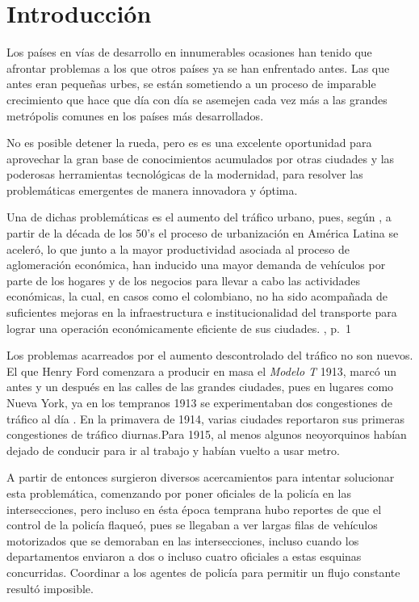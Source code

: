 \hypertarget{introducciuxf3n}{%
\section{Introducción}\label{introducciuxf3n}}

Los países en vías de desarrollo en innumerables ocasiones han tenido
que afrontar problemas a los que otros países ya se han enfrentado
antes. Las que antes eran pequeñas urbes, se están sometiendo a un
proceso de imparable crecimiento que hace que día con día se asemejen
cada vez más a las grandes metrópolis comunes en los países más
desarrollados.

No es posible detener la rueda, pero es es una excelente oportunidad
para aprovechar la gran base de conocimientos acumulados por otras
ciudades y las poderosas herramientas tecnológicas de la modernidad,
para resolver las problemáticas emergentes de manera innovadora y
óptima.

Una de dichas problemáticas es el aumento del tráfico urbano, pues,
según \textcite[p.~27]{PdaCunha2009}, a partir de la década de los 50's
el proceso de urbanización en América Latina se aceleró, lo que junto a
la mayor productividad asociada al proceso de aglomeración económica,
han inducido una mayor demanda de vehículos por parte de los hogares y
de los negocios para llevar a cabo las actividades económicas, la cual,
en casos como el colombiano, no ha sido acompañada de suficientes
mejoras en la infraestructura e institucionalidad del transporte para
lograr una operación económicamente eficiente de sus ciudades.
\textcite{Medina-Durango2011}, p.~1

Los problemas acarreados por el aumento descontrolado del tráfico no son
nuevos. El que Henry Ford comenzara a producir en masa el \emph{Modelo
T} 1913, marcó un antes y un después en las calles de las grandes
ciudades, pues en lugares como Nueva York, ya en los tempranos 1913 se
experimentaban dos congestiones de tráfico al día
\textcite[p.380]{McShane1999}. En la primavera de 1914, varias ciudades
reportaron sus primeras congestiones de tráfico diurnas.Para 1915, al
menos algunos neoyorquinos habían dejado de conducir para ir al trabajo
y habían vuelto a usar metro. \textcite[p.380]{McShane1999}

A partir de entonces surgieron diversos acercamientos para intentar
solucionar esta problemática, comenzando por poner oficiales de la
policía en las intersecciones, pero incluso en ésta época temprana hubo
reportes de que el control de la policía flaqueó, pues se llegaban a ver
largas filas de vehículos motorizados que se demoraban en las
intersecciones, incluso cuando los departamentos enviaron a dos o
incluso cuatro oficiales a estas esquinas concurridas. Coordinar a los
agentes de policía para permitir un flujo constante resultó imposible.
\textcite[p. 382]{McShane1999}

